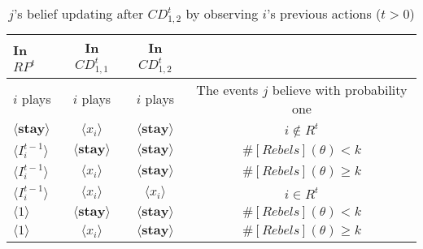 \documentclass[12pt,letter]{article}
\theoremstyle{definition}
\theoremstyle{remark}
\theoremstyle{claim}
\begin{document}
\begin{table}[ht]
\caption{$j$'s belief updating after $CD^t_{1,2}$ by observing $i$'s previous actions  ($t>0$)}
\label{Table_blf_up_cdt12}
\begin{center}
\begin{tabular}{l c c c}
In $RP^t$ 	 	&  	In $CD^t_{1,1}$		&  In $CD^t_{1,2}$	  &\\
\hline
\hline
$i$ plays 		                             &  	$i$ plays		&				$i$ plays			& The events $j$ believe with probability one  \\
\hline
$\langle  \textbf{stay} \rangle$ 	& 	$\langle x_i \rangle$	&  $\langle \textbf{stay} \rangle$ &  $i\notin R^t$ \\
$\langle  {I^{t-1}_i} \rangle$ 		&  $\langle \textbf{stay} \rangle$	&	$\langle \textbf{stay} \rangle$ &  $\#[Rebels](\theta)< k$   \\
$\langle  {I^{t-1}_i} \rangle$ 		&  $\langle x_i \rangle$	&	$\langle \textbf{stay} \rangle$ &  $\#[Rebels](\theta)\geq k$    \\
$\langle  {I^{t-1}_i} \rangle$ 		&  $\langle x_i \rangle$	&	$\langle x_i \rangle$ &  $i\in R^t$  \\
$\langle 1 \rangle$ 		             &  $\langle \textbf{stay} \rangle$	&	$\langle \textbf{stay} \rangle$ &  $\#[Rebels](\theta)< k$\\
$\langle 1 \rangle$ 		             &  $\langle x_i \rangle$	&	$\langle \textbf{stay} \rangle$ & $\#[Rebels](\theta)\geq k$
\end{tabular}
\end{center}
\end{table}
\end{document}
